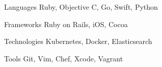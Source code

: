 

\begin{cvskills}

  \cvskill
    {Languages} %
    {Ruby, Objective C, Go, Swift, Python} %
    
  \cvskill
    {Frameworks} %
    {Ruby on Rails, iOS, Cocoa} %
    
  \cvskill
    {Technologies} %
    {Kubernetes, Docker, Elasticsearch} %

  \cvskill
    {Tools} %
    {Git, Vim, Chef, Xcode, Vagrant} %

\end{cvskills}
